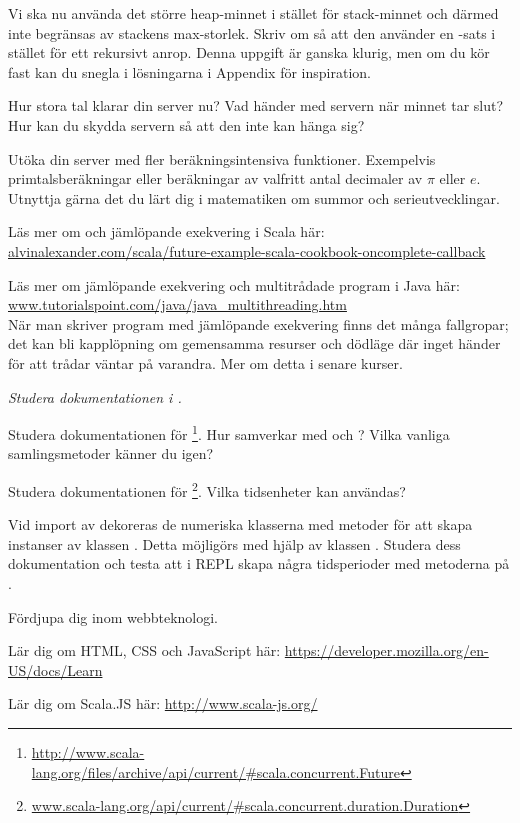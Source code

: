 \Subtask Vi ska nu använda det större heap-minnet i stället för stack-minnet och därmed inte begränsas av stackens max-storlek. Skriv om  så att den använder en -sats i stället för ett rekursivt anrop. Denna uppgift är ganska klurig, men om du kör fast kan du snegla i lösningarna i Appendix för inspiration. 

Hur stora tal klarar din server nu? Vad händer med servern när minnet tar slut? Hur kan du skydda servern så att den inte kan hänga sig?

\Task Utöka din server med fler beräkningsintensiva funktioner. Exempelvis primtalsberäkningar eller beräkningar av valfritt antal decimaler av $\pi$ eller $e$. Utnyttja gärna det du lärt dig i  matematiken om summor och serieutvecklingar.

\Task Läs mer om  och jämlöpande exekvering i Scala här:\\
\href{http://alvinalexander.com/scala/future-example-scala-cookbook-oncomplete-callback}{alvinalexander.com/scala/future-example-scala-cookbook-oncomplete-callback}

\Task Läs mer om jämlöpande exekvering och multitrådade program i Java här: \href{http://www.tutorialspoint.com/java/java_multithreading.htm}{www.tutorialspoint.com/java/java\_multithreading.htm}  \\
\noindent När man skriver program med jämlöpande exekvering finns det många fallgropar; det kan bli kapplöpning  om gemensamma resurser och dödläge  där inget händer för att trådar väntar på varandra. Mer om detta i senare kurser. 


\Task\Pen \emph{Studera dokumentationen i .} 

\Subtask Studera dokumentationen för \footnote{\href{http://www.scala-lang.org/files/archive/api/current/\#scala.concurrent.Future}{http://www.scala-lang.org/files/archive/api/current/\#scala.concurrent.Future}}. Hur samverkar  med  och ? Vilka vanliga samlingsmetoder känner du igen?

\Subtask Studera dokumentationen för \footnote{\href{http://www.scala-lang.org/api/current/\#scala.concurrent.duration.Duration}{www.scala-lang.org/api/current/\#scala.concurrent.duration.Duration}}. Vilka tidsenheter kan användas? 

\Subtask Vid import av  dekoreras de numeriska klasserna med metoder för att skapa instanser av klassen . Detta möjligörs med hjälp av klassen . Studera dess dokumentation och testa att i REPL skapa några tidsperioder med metoderna på .



\Task Fördjupa dig inom webbteknologi. 
    
\Subtask Lär dig om HTML, CSS och JavaScript här: \url{https://developer.mozilla.org/en-US/docs/Learn}

\Subtask Lär dig om Scala.JS här: \url{http://www.scala-js.org/}




